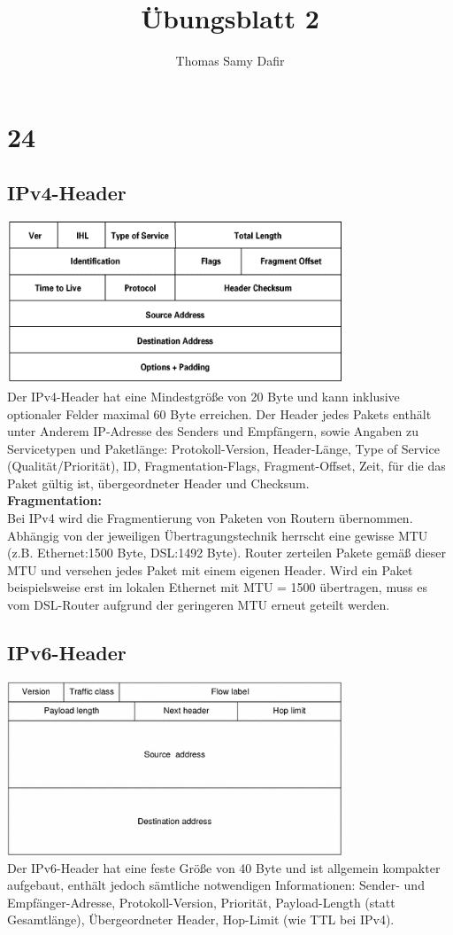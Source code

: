\documentclass[12pt, a4paper]{article}
\title{Übungsblatt 2}
\author{Thomas Samy Dafir}
\date{}
\begin{document}
	\maketitle

	\section*{24}
	\subsection*{IPv4-Header}
	\includegraphics[width=10cm]{ip4_header.png}\\
	Der IPv4-Header hat eine Mindestgröße von 20 Byte und kann inklusive optionaler Felder maximal 60 Byte erreichen.
	Der Header jedes Pakets enthält unter Anderem IP-Adresse des Senders und Empfängern, sowie Angaben zu Servicetypen und Paketlänge: Protokoll-Version, Header-Länge, Type of Service (Qualität/Priorität), ID, Fragmentation-Flags, Fragment-Offset, Zeit, für die das Paket gültig ist, übergeordneter Header und Checksum.\\
	\textbf{Fragmentation:}\\
	Bei IPv4 wird die Fragmentierung von Paketen von Routern übernommen. Abhängig von der jeweiligen Übertragungstechnik herrscht eine gewisse MTU (z.B. Ethernet:1500 Byte, DSL:1492 Byte). Router zerteilen Pakete gemäß dieser MTU und versehen jedes Paket mit einem eigenen Header. Wird ein Paket beispielsweise erst im lokalen Ethernet mit MTU = 1500 übertragen, muss es vom DSL-Router aufgrund der geringeren MTU erneut geteilt werden.
	\subsection*{IPv6-Header}
	\includegraphics[width=10cm]{ip6_header.png}\\
	Der IPv6-Header hat eine feste Größe von 40 Byte und ist allgemein kompakter aufgebaut, enthält jedoch sämtliche notwendigen Informationen: Sender- und Empfänger-Adresse, Protokoll-Version, Priorität, Payload-Length (statt Gesamtlänge), Übergeordneter Header, Hop-Limit (wie TTL bei IPv4).
\end{document}
